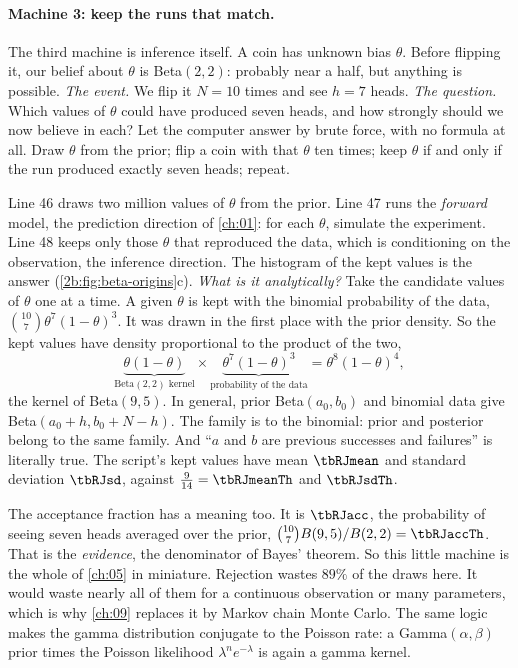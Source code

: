 \paragraph{Machine 3: keep the runs that match.} The third machine is inference itself. A coin has unknown bias $\theta$. Before flipping it, our belief about $\theta$ is Beta$(2,2)$: probably near a half, but anything is possible. \emph{The event.} We flip it $N=10$ times and see $h=7$ heads. \emph{The question.} Which values of $\theta$ could have produced seven heads, and how strongly should we now believe in each? Let the computer answer by brute force, with no formula at all. Draw $\theta$ from the prior; flip a coin with that $\theta$ ten times; keep $\theta$ if and only if the run produced exactly seven heads; repeat.


Line 46 draws two million values of $\theta$ from the prior. Line 47 runs the \emph{forward} model, the prediction direction of \cref{ch:01}: for each $\theta$, simulate the experiment. Line 48 keeps only those $\theta$ that reproduced the data, which is conditioning on the observation, the inference direction. The histogram of the kept values is the answer (\cref{2b:fig:beta-origins}c). \emph{What is it analytically?} Take the candidate values of $\theta$ one at a time. A given $\theta$ is kept with the binomial probability of the data, $\binom{10}{7}\theta^7(1-\theta)^3$. It was drawn in the first place with the prior density. So the kept values have density proportional to the product of the two,
\[
  \underbrace{\theta(1-\theta)}_{\text{Beta}(2,2)\text{ kernel}}\times\underbrace{\theta^7(1-\theta)^3}_{\text{probability of the data}}=\theta^{8}(1-\theta)^{4},
\]
the kernel of Beta$(9,5)$. In general, prior Beta$(a_0,b_0)$ and binomial data give Beta$(a_0+h,b_0+N-h)$. The family is  to the binomial: prior and posterior belong to the same family. And ``$a$ and $b$ are previous successes and failures'' is literally true. The script's kept values have mean $\tbRJmean$ and standard deviation $\tbRJsd$, against $\frac{9}{14}=\tbRJmeanTh$ and $\tbRJsdTh$.

The acceptance fraction has a meaning too. It is $\tbRJacc$, the probability of seeing seven heads averaged over the prior, $\binom{10}{7}B(9,5)/B(2,2)=\tbRJaccTh$. That is the \emph{evidence}, the denominator of Bayes' theorem. So this little machine is the whole of \cref{ch:05} in miniature. Rejection wastes $89\%$ of the draws here. It would waste nearly all of them for a continuous observation or many parameters, which is why \cref{ch:09} replaces it by Markov chain Monte Carlo. The same logic makes the gamma distribution conjugate to the Poisson rate: a Gamma$(\alpha,\beta)$ prior times the Poisson likelihood $\lambda^ne^{-\lambda}$ is again a gamma kernel.

